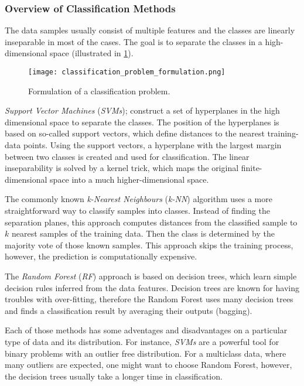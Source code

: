 \subsubsection*{Overview of Classification Methods} \label{ssec:other_classification_methods}
The data samples usually consist of multiple features and the classes are linearly inseparable in most of the cases. The goal is to separate the classes in a high-dimensional space (illustrated in \cref{img:classification_problem_formulation}).

\begin{figure}[H]
  \centering
  \texttt{[image: classification\_problem\_formulation.png]}
  \caption{Formulation of a classification problem.}
  \label{img:classification_problem_formulation}
\end{figure}

\textit{Support Vector Machines} (\textit{SVMs}); \citep{article:svm} construct a set of hyperplanes in the high dimensional space to separate the classes. The position of the hyperplanes is based on so-called support vectors, which define distances to the nearest training-data points. Using the support vectors, a hyperplane with the largest margin between two classes is created and used for classification. The linear inseparability is solved by a kernel trick, which maps the original finite-dimensional space into a much higher-dimensional space.

The commonly known \textit{k-Nearest Neighbours} (\textit{k-NN}) algorithm uses a more straightforward way to classify samples into classes. Instead of finding the separation planes, this approach computes distances from the classified sample to $ k $ nearest samples of the training data. Then the class is determined by the majority vote of those known samples. This approach skips the training process, however, the prediction is computationally expensive.

The \textit{Random Forest} (\textit{RF}) approach \citep{article:rf} is based on decision trees, which learn simple decision rules inferred from the data features. Decision trees are known for having troubles with over-fitting, therefore the Random Forest uses many decision trees and finds a classification result by averaging their outputs (bagging).

Each of those methods has some adventages and disadvantages on a particular type of data and its distribution. For instance, \textit{SVMs} are a powerful tool for binary problems with an outlier free distribution. For a multiclass data, where many outliers are expected, one might want to choose Random Forest, however, the decision trees usually take a longer time in classification.

